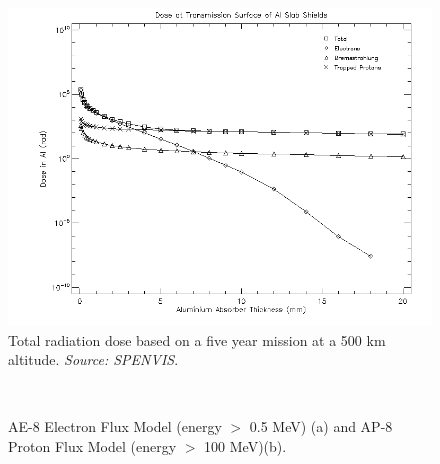 \begin{figure}[!h]
\centering
\includegraphics[width = \textwidth]{chapters/img/sd2_dose.png}
\caption{Total radiation dose based on a five year mission at a 500 km altitude. \emph{Source: SPENVIS}. }
\label{fig:dose}
\end{figure}

\begin{figure}
  \centering
  \\                
  \caption{AE-8 Electron Flux Model (energy $>$ 0.5 MeV) (a) and AP-8 Proton Flux Model (energy $>$ 100 MeV)(b).}
  \label{fig:elecFlux}
\end{figure}
 